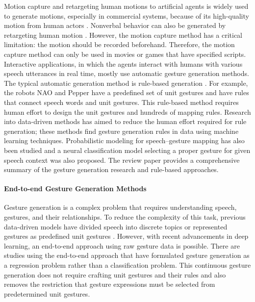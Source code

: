 \documentclass[acmtog]{acmart}
\begin{document}
Motion capture and retargeting human motions to artificial agents is widely used to generate motions, especially in commercial systems, because of its high-quality motion from human actors \cite{menache2000understanding}. Nonverbal behavior can also be generated by retargeting human motion \cite{kim2019c}. However, the motion capture method has a critical limitation: the motion should be recorded beforehand. Therefore, the motion capture method can only be used in movies or games that have specified scripts. Interactive applications, in which the agents interact with humans with various speech utterances in real time, mostly use automatic gesture generation methods. The typical automatic generation method is rule-based generation \cite{cassell2004beat, kopp2006towards, marsella2013virtual}. For example, the robots NAO and Pepper \cite{naoqi} have a predefined set of unit gestures and have rules that connect speech words and unit gestures. This rule-based method requires human effort to design the unit gestures and hundreds of mapping rules. Research into data-driven methods has aimed to reduce the human effort required for rule generation; these methods find gesture generation rules in data using machine learning techniques. Probabilistic modeling for speech--gesture mapping has also been studied \cite{kipp2005gesture, levine2010gesture, huang2014learning} and a neural classification model selecting a proper gesture for given speech context \cite{chiu2015predicting} was also proposed. The review paper \cite{wagner2014gesture} provides a comprehensive summary of the gesture generation research and rule-based approaches.

\paragraph{End-to-end Gesture Generation Methods}

Gesture generation is a complex problem that requires understanding speech, gestures, and their relationships. To reduce the complexity of this task, previous data-driven models have divided speech into discrete topics \cite{sadoughi2019speech} or represented gestures as predefined unit gestures \cite{kipp2005gesture, levine2010gesture, huang2014learning}. However, with recent advancements in deep learning, an end-to-end approach using raw gesture data is possible. There are studies using the end-to-end approach \cite{ginosar2019gestures, yoon2019robots, ferstl2019multi, kucherenko2019analyzing, kucherenko2020gesticulator} that have formulated gesture generation as a regression problem rather than a classification problem. This continuous gesture generation does not require crafting unit gestures and their rules and also removes the restriction that gesture expressions must be selected from predetermined unit gestures. 
\end{document}
